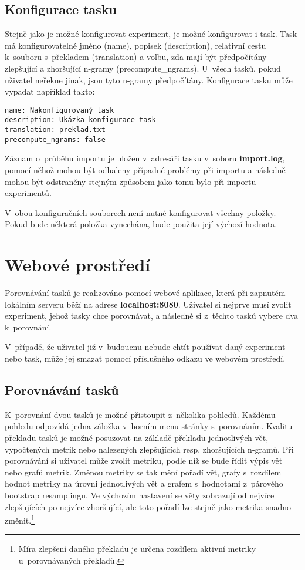 \subsection{Konfigurace tasku}
Stejně jako je možné konfigurovat experiment, je možné konfigurovat i task.
Task má konfigurovatelné jméno (name), popisek (description),
  relativní cestu k~souboru s~překladem (translation) a volbu,
  zda mají být předpočítány zlepšující a zhoršující \mbox{n-gramy} (precompute\_ngrams).
U~všech tasků, pokud uživatel neřekne jinak, 
  jsou tyto \mbox{n-gramy} předpočítány.
Konfigurace tasku může vypadat například takto:

\begin{verbatim}
name: Nakonfigurovaný task
description: Ukázka konfigurace task
translation: preklad.txt
precompute_ngrams: false
\end{verbatim}

Záznam o~průběhu importu je uložen v~adresáři tasku v~soboru \textbf{import.log},
  pomocí něhož mohou být odhaleny případné problémy při importu
  a následně mohou být odstraněny stejným způsobem jako tomu bylo při importu experimentů.

V~obou konfiguračních souborech není nutné konfigurovat všechny položky.
Pokud bude některá položka vynechána,
  bude použita její výchozí hodnota. 

\section{Webové prostředí}
Porovnávání tasků je realizováno pomocí webové aplikace,
  která při zapnutém lokálním serveru běží na adrese \textbf{localhost:8080}.
Uživatel si nejprve musí zvolit experiment,
  jehož tasky chce porovnávat, a následně si z~těchto tasků vybere dva k~porovnání.

V~případě,
  že uživatel již v~budoucnu nebude chtít používat daný experiment nebo task,
  může jej smazat pomocí příslušného odkazu ve webovém prostředí.

\subsection{Porovnávání tasků}
K~porovnání dvou tasků je možné přistoupit z~několika pohledů.
Každému pohledu odpovídá jedna záložka v~horním menu stránky s~porovnáním.
Kvalitu překladu tasků je možné posuzovat na základě překladu jednotlivých vět,
  vypočtených metrik nebo nalezených zlepšujících resp. zhoršujících \mbox{n-gramů}.
Při porovnávání si uživatel může zvolit metriku,
  podle níž se bude řídit výpis vět nebo grafů metrik.
Změnou metriky se tak mění pořadí vět,
  grafy s~rozdílem hodnot metriky na úrovni jednotlivých vět
  a grafem s~hodnotami z~párového bootstrap resamplingu.
Ve výchozím nastavení se věty zobrazují od nejvíce zlepšujících po nejvíce zhoršující,
  ale toto pořadí lze stejně jako metrika snadno změnit.\footnote{
    Míra zlepšení daného překladu je určena rozdílem aktivní metriky u~porovnávaných překladů.
  }

